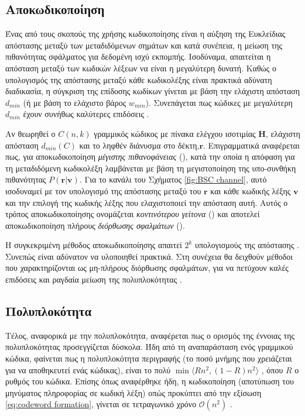 \subsection{Αποκωδικοποίηση}

Ένας από τους σκοπούς της χρήσης κωδικοποίησης είναι η αύξηση της Ευκλείδιας απόστασης μεταξύ των μεταδιδόμενων σημάτων και κατά συνέπεια, η μείωση της πιθανότητας σφάλματος για δεδομένη ισχύ εκπομπής. Ισοδύναμα, απαιτείται η απόσταση  μεταξύ των κωδικών λέξεων να είναι η μεγαλύτερη δυνατή. Καθώς ο υπολογισμός της απόστασης  μεταξύ κάθε κωδικολέξης είναι πρακτικά αδύνατη διαδικασία, η σύγκριση της επίδοσης κωδίκων γίνεται με βάση την ελάχιστη απόσταση $d_{min}$ (ή με βάση το ελάχιστο βάρος $w_{min}$). Συνεπάγεται πως κώδικες με μεγαλύτερη $d_{min}$ έχουν συνήθως καλύτερες επιδόσεις \cite{proakis1994communication}.

Αν θεωρηθεί ο $C(n,k)$ γραμμικός  κώδικος με πίνακα ελέγχου ισοτιμίας $\mathbf{H}$, ελάχιστη απόσταση $d_{min}(C)$ και το ληφθέν διάνυσμα στο δέκτη,$\mathbf{r}$. Επιγραμματικά αναφέρεται πως, για αποκωδικοποίηση \textit{μέγιστης πιθανοφάνειας} (), κατά την οποία η απόφαση για τη μεταδιδόμενη κωδικολέξη λαμβάνεται με βάση τη μεγιστοποίηση της υπο-συνθήκη πιθανότητας $P(\mathbf{r}|\mathbf{v})$. Για το κανάλι  του Σχήματος \ref{fig:BSC channel}, αυτό ισοδυναμεί με τον υπολογισμό της απόστασης μεταξύ του $\mathbf{r}$ και κάθε κωδικής λέξης $\mathbf{v}$ και την επιλογή της κωδικής λέξης που ελαχιστοποιεί την απόσταση αυτή. Αυτός ο τρόπος αποκωδικοποίησης ονομάζεται \textit{κοντινότερου γείτονα} () και αποτελεί αποκωδικοποίηση πλήρους \textit{διόρθωσης σφαλμάτων} ().

Η συγκεκριμένη μέθοδος αποκωδικοποίησης απαιτεί $2^k$ υπολογισμούς της απόστασης . Συνεπώς είναι αδύνατον να υλοποιηθεί πρακτικά. Στη συνέχεια θα δειχθούν μέθοδοι που χαρακτηρίζονται ως μη-πλήρους διόρθωσης σφαλμάτων, για να πετύχουν καλές επιδόσεις και ραγδαία μείωση της πολυπλοκότητας \cite{ryan2009channel}.

\subsection{Πολυπλοκότητα}

Τέλος, αναφορικά με την πολυπλοκότητα, αναφέρεται πως ο ορισμός της έννοιας της πολυπλοκότητας προσεγγίζεται δύσκολα. Ήδη από τη αναπαράσταση ενός γραμμικού  κώδικα, φαίνεται πως η πολυπλοκότητα περιγραφής (το ποσό μνήμης που χρειάζεται για να αποθηκευτεί ενάς κώδικας), είναι το πολύ $\min\langle Rn^2, \left(1-R\right)n^2\rangle$ , όπου $R$ ο ρυθμός του κώδικα. Επίσης όπως αναφέρθηκε ήδη, η κωδικοποίηση (αποτύπωση του μηνύματος πληροφορίας σε κωδική λέξη) οπώς προκύπτει από την εξίσωση \ref{eq:codeword formation}, γίνεται σε τετραγωνικό χρόνο $\mathcal{O}(n^2)$ \cite{richardson2008modern}.

